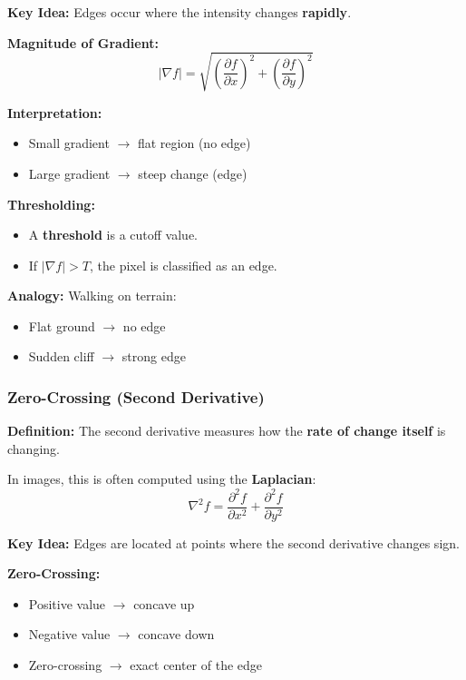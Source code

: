 \documentclass[12pt]{article}
\begin{document}
\textbf{Key Idea:}
Edges occur where the intensity changes \textbf{rapidly}.

\textbf{Magnitude of Gradient:}
\[
    |\nabla f| = \sqrt{\left(\frac{\partial f}{\partial x}\right)^2 + \left(\frac{\partial f}{\partial y}\right)^2}
\]

\textbf{Interpretation:}
\begin{itemize}
    \item Small gradient $\rightarrow$ flat region (no edge)
    \item Large gradient $\rightarrow$ steep change (edge)
\end{itemize}

\textbf{Thresholding:}
\begin{itemize}
    \item A \textbf{threshold} is a cutoff value.
    \item If $|\nabla f| > T$, the pixel is classified as an edge.
\end{itemize}

\textbf{Analogy:}
Walking on terrain:
\begin{itemize}
    \item Flat ground $\rightarrow$ no edge
    \item Sudden cliff $\rightarrow$ strong edge
\end{itemize}

\subsubsection{Zero-Crossing (Second Derivative)}

\textbf{Definition:}
The second derivative measures how the \textbf{rate of change itself} is changing.

In images, this is often computed using the \textbf{Laplacian}:
\[
    \nabla^2 f = \frac{\partial^2 f}{\partial x^2} + \frac{\partial^2 f}{\partial y^2}
\]

\textbf{Key Idea:}
Edges are located at points where the second derivative changes sign.

\textbf{Zero-Crossing:}
\begin{itemize}
    \item Positive value $\rightarrow$ concave up
    \item Negative value $\rightarrow$ concave down
    \item Zero-crossing $\rightarrow$ exact center of the edge
\end{itemize}
\end{document}
